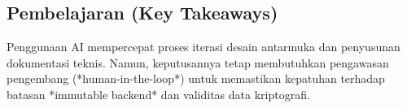 \documentclass[12pt, a4paper]{article}
\begin{document}
\subsection{Pembelajaran (Key Takeaways)}
Penggunaan AI mempercepat proses iterasi desain antarmuka dan penyusunan dokumentasi teknis. Namun, keputusannya tetap membutuhkan pengawasan pengembang (*human-in-the-loop*) untuk memastikan kepatuhan terhadap batasan *immutable backend* dan validitas data kriptografi.
\end{document}
